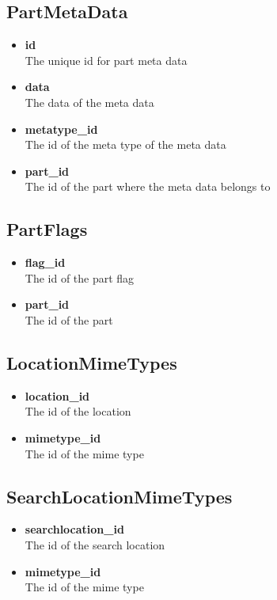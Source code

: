 \documentclass[]{report}
\begin{document}
\subsection{PartMetaData}
\begin{itemize}
  \item \textbf{id}\\
    The unique id for part meta data
  \item \textbf{data}\\
    The data of the meta data
  \item \textbf{metatype\_id}\\
    The id of the meta type of the meta data
  \item \textbf{part\_id}\\
    The id of the part where the meta data belongs to
\end{itemize}

\subsection{PartFlags}
\begin{itemize}
  \item \textbf{flag\_id}\\
    The id of the part flag
  \item \textbf{part\_id}\\
    The id of the part
\end{itemize}

\subsection{LocationMimeTypes}
\begin{itemize}
  \item \textbf{location\_id}\\
    The id of the location
  \item \textbf{mimetype\_id}\\
    The id of the mime type
\end{itemize}

\subsection{SearchLocationMimeTypes}
\begin{itemize}
  \item \textbf{searchlocation\_id}\\
    The id of the search location
  \item \textbf{mimetype\_id}\\
    The id of the mime type
\end{itemize}
\end{document}
